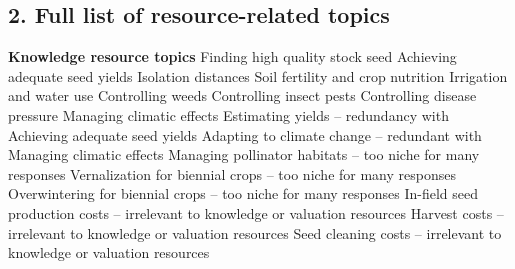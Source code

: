 \documentclass[twoside,12pt,final]{ucthesis-CA2012}
\begin{document}
\begin{ucmainmatter}
\begin{table}
\caption{\label{tab:unnamed-chunk-27}Sample representativeness across US regions and spatial scales}
\centering
{}
\end{table}
\hypertarget{full-list-of-resource-related-topics}{%
\section{2. Full list of resource-related topics}\label{full-list-of-resource-related-topics}}

\textbf{Knowledge resource topics}
Finding high quality stock seed
Achieving adequate seed yields
Isolation distances
Soil fertility and crop nutrition
Irrigation and water use
Controlling weeds
Controlling insect pests
Controlling disease pressure
Managing climatic effects
Estimating yields -- redundancy with Achieving adequate seed yields
Adapting to climate change -- redundant with Managing climatic effects
Managing pollinator habitats -- too niche for many responses
Vernalization for biennial crops -- too niche for many responses
Overwintering for biennial crops -- too niche for many responses
In-field seed production costs -- irrelevant to knowledge or valuation resources
Harvest costs -- irrelevant to knowledge or valuation resources
Seed cleaning costs -- irrelevant to knowledge or valuation resources


\end{ucmainmatter}
\end{document}
